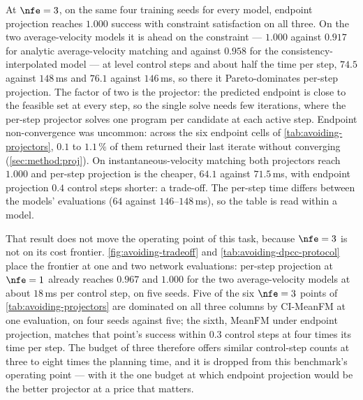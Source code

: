At $\nfe=3$, on the same four training seeds for every model, endpoint projection reaches $1.000$ success
with constraint satisfaction on all three. On the two average-velocity models it is ahead on the
constraint --- $1.000$ against $0.917$ for analytic average-velocity matching and against $0.958$ for the
consistency-interpolated model --- at level control steps and about half the time per step, $74.5$ against
$148$\,ms and $76.1$ against $146$\,ms, so there it Pareto-dominates per-step projection. The factor of two
is the projector: the predicted endpoint is close to the feasible set at every step, so the single solve
needs few iterations, where the per-step projector solves one program per candidate at each active step.
Endpoint non-convergence was uncommon: across the six endpoint cells of \autoref{tab:avoiding-projectors}, $0.1$ to
$1.1\,\%$ of them returned their last iterate without converging (\autoref{sec:method:proj}).
On instantaneous-velocity matching both projectors reach $1.000$ and per-step projection is the cheaper,
$64.1$ against $71.5$\,ms, with endpoint projection $0.4$ control steps shorter: a trade-off. The per-step
time differs between the models' evaluations ($64$ against $146$--$148$\,ms), so the table is read within
a model.

That result does not move the operating point of this task, because $\nfe=3$ is not on its cost frontier.
\autoref{fig:avoiding-tradeoff} and \autoref{tab:avoiding-dpcc-protocol} place the frontier at one and
two network evaluations: per-step projection at $\nfe=1$ already reaches $0.967$ and $1.000$ for the two
average-velocity models at about $18$\,ms per control step, on five seeds. Five of the six $\nfe=3$ points of
\autoref{tab:avoiding-projectors} are dominated on all three columns by CI-MeanFM at one evaluation, on four
seeds against five; the sixth, MeanFM under endpoint projection, matches that point's success within $0.3$
control steps at four times its time per step. The budget of three therefore offers similar control-step
counts at three to eight times the planning time, and it is dropped from this benchmark's operating point
--- with it the one budget at which endpoint projection would be the better projector at a price that
matters.

